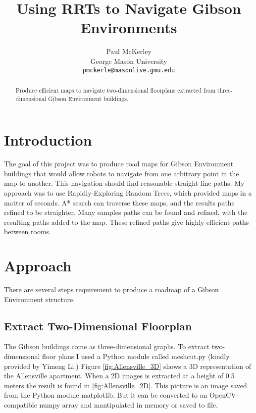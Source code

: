 \documentclass[10pt,twocolumn,letterpaper]{article}
\begin{document}
\title{Using RRTs to Navigate Gibson Environments}

\author{Paul McKerley\\
George Mason University\\
{\tt\small pmckerle@masonlive.gmu.edu}
}

\frenchspacing
\maketitle
\thispagestyle{empty}

\begin{abstract}
  Produce efficient maps to navigate two-dimensional floorplans
  extracted from three-dimensional Gibson Environment buildings.
\end{abstract}

\section{Introduction}

  The goal of this project was to produce road maps for Gibson
  Environment buildings that would allow robots to navigate from one
  arbitrary point in the map to another. This navigation should find
  reasonable straight-line paths. My approach was to use
  Rapidly-Exploring Random Trees, which provided maps in a matter of
  seconds. A* search can traverse these maps, and the results paths
  refined to be straighter. Many samples paths can be found and
  refined, with the resulting paths added to the map. These refined
  paths give highly efficient paths between rooms.

\section{Approach}

There are several steps requirement to produce a roadmap of a Gibson
Environment structure.

\subsection{Extract Two-Dimensional Floorplan}

The Gibson buildings come as three-dimensional graphs. To extract
two-dimensional floor plans I used a Python module called meshcut.py
(kindly provided by Yimeng Li.) Figure \ref{fig:Allensville_3D} shows
a 3D representation of the Allensville apartment. When a 2D images is
extracted at a height of 0.5 meters the result is found in
\ref{fig:Allensville_2D}.  This picture is an image saved from the
Python module matplotlib. But it can be converted to an
OpenCV-compatible numpy array and mantipulated in memory or saved to
file.
\end{document}
